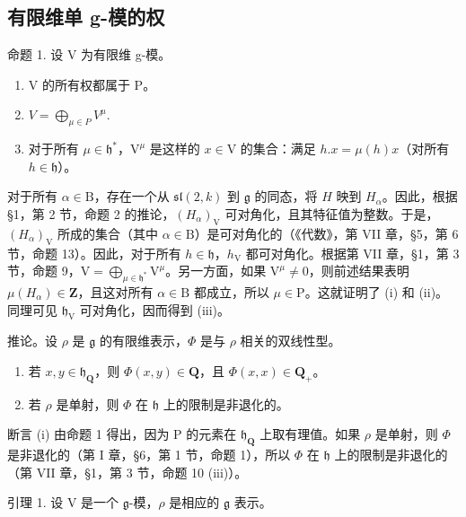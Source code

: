 \subsection{有限维单 g-模的权}

命题 1. 设 V 为有限维 g-模。

\begin{enumerate}
\def\labelenumi{(\roman{enumi})}
\item
  V 的所有权都属于 P。
\item
  \(V = \bigoplus_{\mu \in P} V^{\mu}.\)
\item
对于所有 \(\mu \in \mathfrak{h}^*\)，\(\mathrm{V}^{\mu}\) 是这样的 \(x \in \mathrm{V}\) 的集合：满足 \(h.x = \mu(h)x\)（对所有 \(h \in \mathfrak{h}\)）。
\end{enumerate}

对于所有 \(\alpha \in \mathrm{B}\)，存在一个从 \(\mathfrak{sl}(2,k)\) 到 \(\mathfrak{g}\) 的同态，将 \(H\) 映到 \(H_{\alpha}\)。因此，根据 §1，第 2 节，命题 2 的推论，\((H_{\alpha})_{\mathrm{V}}\) 可对角化，且其特征值为整数。于是，\((H_{\alpha})_{\mathrm{V}}\) 所成的集合（其中 \(\alpha \in \mathrm{B}\)）是可对角化的（《代数》，第 VII 章，§5，第 6 节，命题 13）。因此，对于所有 \(h \in \mathfrak{h}\)，\(h_{\mathrm{V}}\) 都可对角化。根据第 VII 章，§1，第 3 节，命题 9，\(\mathrm{V} = \bigoplus_{\mu \in \mathfrak{h}^*} \mathrm{V}^{\mu}\)。另一方面，如果 \(\mathrm{V}^{\mu} \neq 0\)，则前述结果表明 \(\mu(H_{\alpha}) \in \mathbf{Z}\)，且这对所有 \(\alpha \in \mathrm{B}\) 都成立，所以 \(\mu \in \mathrm{P}\)。这就证明了 (i) 和 (ii)。同理可见 \(\mathfrak{h}_{\mathrm{V}}\) 可对角化，因而得到 (iii)。

推论。设 \(\rho\) 是 \(\mathfrak{g}\) 的有限维表示，\(\Phi\) 是与 \(\rho\) 相关的双线性型。

\begin{enumerate}
\def\labelenumi{(\roman{enumi})}
\item
  若 \(x, y \in \mathfrak{h}_{\mathbf{Q}}\)，则 \(\Phi(x, y) \in \mathbf{Q}\)，且 \(\Phi(x, x) \in \mathbf{Q}_{+}\)。
\item
  若 \(\rho\) 是单射，则 \(\Phi\) 在 \(\mathfrak{h}\) 上的限制是非退化的。
\end{enumerate}

断言 (i) 由命题 1 得出，因为 P 的元素在 \(\mathfrak{h}_{\mathbf{Q}}\) 上取有理值。如果 \(\rho\) 是单射，则 \(\Phi\) 是非退化的（第 I 章，§6，第 1 节，命题 1），所以 \(\Phi\) 在 \(\mathfrak{h}\) 上的限制是非退化的（第 VII 章，§1，第 3 节，命题 10 (iii)）。

引理 1. 设 \(\mathrm{V}\) 是一个 \(\mathfrak{g}\)-模，\(\rho\) 是相应的 \(\mathfrak{g}\) 表示。

